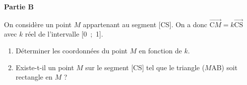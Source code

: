 \documentclass[10pt]{article}
\providecommand{\vect}[1]{\overrightarrow{#1}}
\begin{document}
\smallskip

\begin{center}\textbf{Partie B} \end{center}

On considère un point $M$ appartenant au segment [CS]. On a donc $\vect{\text{C}M} = k\vect{\text{CS}}$ avec  $k$ réel de l'intervalle [0~;~1].

\medskip

\begin{enumerate}
\item Déterminer les coordonnées du point $M$ en fonction de $k$.
\item Existe-t-il un point $M$ sur le segment [CS] tel que le triangle ($M$AB) soit rectangle
en $M$ ?
\end{enumerate}

\bigskip
\end{document}
